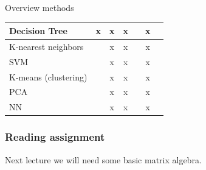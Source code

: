 \documentclass{beamer}
\begin{document}
\begin{frame}{Overview methods}
\begin{tiny}
\begin{tabular}{l|cc|cc|cc|}
            Decision Tree & x & x  & x &  {} & x & {} \\ \hline
            K-nearest neighbors & {} & x  & x & {}  & x & {}\\ \hline
            SVM  & {} & x  & x & {}  & x & {}\\ \hline
            K-means (clustering)  & {} & x  & x & {}  & x & {}\\ \hline
            PCA & {} & x  & x & {}  & x & {} \\ \hline
            NN & {} & x  & x & {}  & x & {}\\
			\hline
		\end{tabular}
    \end{tiny}
	\end{frame}
    
    
    \begin{frame}
    \frametitle{Reading assignment}
    Next lecture we will need some basic matrix algebra.
    
    
    \end{frame}
    
\end{document}
